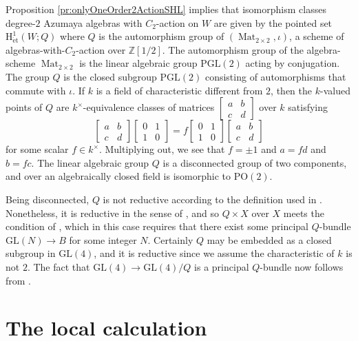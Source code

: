 \documentclass[reqno,oneside,dvipsnames,pdfnames,final]{amsart}
\theoremstyle{definition}
\newcommand{\Z}{\mathbb{Z}}
\newcommand{\GL}{\mathrm{GL}}
\newcommand{\PGL}{\mathrm{PGL}}
\newcommand{\et}{\mathrm{\acute et}}
\newcommand{\Hoh}{\mathrm{H}}
\newcommand{\Mat}{\operatorname{Mat}}
\newcommand{\PO}{\mathrm{PO}}
\begin{document}
Proposition \ref{pr:onlyOneOrder2ActionSHL} implies that isomorphism classes degree-$2$ Azumaya algebras with $C_2$-action on $W$ are given by the pointed set $\Hoh^1_\et(W; Q)$ where $Q$ is the automorphism group of $(\Mat_{2 \times 2}, \iota)$, a scheme of algebras-with-$C_2$-action over $\Z[1/2]$. The automorphism group of the algebra-scheme $\Mat_{2 \times 2}$ is the linear algebraic group $\PGL(2)$ acting by conjugation. The group $Q$ is the closed subgroup $\PGL(2)$ consisting of automorphisms that commute with $\iota$. If $k$ is a field of characteristic different from $2$, then the $k$-valued points of $Q$ are $k^\times$-equivalence classes of matrices 
$\begin{bmatrix}
  a & b \\ c & d
\end{bmatrix}$ over $k$
satisfying
\[
  \begin{bmatrix}
    a & b \\ c & d 
  \end{bmatrix}
  \begin{bmatrix}
    0 & 1 \\ 1 & 0 
  \end{bmatrix} = f \begin{bmatrix}
    0 & 1 \\ 1 & 0 
  \end{bmatrix} \begin{bmatrix}
    a & b \\ c & d 
  \end{bmatrix}\]
for some scalar $f \in k^\times$. Multiplying out, we see that $f = \pm 1$ and $a=fd$ and $b=fc$. The linear algebraic group $Q$ is a disconnected group of two components, and over an algebraically closed field is isomorphic to $\PO(2)$.

Being disconnected, $Q$ is not reductive according to the definition used in \cite{Colliot-Thelene1979}. Nonetheless, it is reductive in the sense of \cite{Mumford1994}, and so $Q \times X$ over $X$ meets the condition of \cite[Rem.\ 6.15]{Colliot-Thelene1979}, which in this case requires that there exist some principal $Q$-bundle $\GL(N) \to B$ for some integer $N$. Certainly $Q$ may be embedded as a closed subgroup in $\GL(4)$, and it is reductive since we assume the characteristic of $k$ is not $2$. The fact that $\GL(4) \to \GL(4)/Q$ is a principal $Q$-bundle now follows from \cite[Prop.\ 0.9 \& Amplification 1.3]{Mumford1994}.

\section{The local calculation}
\label{sec:local-calculation}
\end{document}
